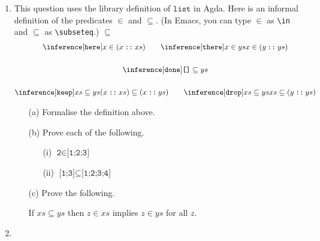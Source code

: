 \documentclass{examhons2018}
\begin{document}
\begin{enumerate}
 
\item \rubricqA

\newcommand{\key}{\texttt}
\newcommand{\List}{\key{list}}
\newcommand{\nil}{\texttt{[]}}
\newcommand{\cons}{\mathbin{\key{::}}}
\newcommand{\member}{\key{member}}
\newcommand{\sublist}{\key{sublist}}

This question uses the library definition of $\List$ in Agda.
Here is an informal definition of the predicates $\in$
and $\subseteq$.  (In Emacs, you can type $\in$ as \verb$\in$ and $\subseteq$ as \verb$\subseteq$.)
$\subseteq$
\begin{gather*}
\inference[$\key{here}$]
  {}
  {x \in (x \cons xs)}
\qquad
\inference[$\key{there}$]
  {x \in ys}
  {x \in (y \cons ys)}
\\~\\
\inference[$\key{done}$]
  {}
  {\nil \subseteq ys}
\\~\\
\inference[$\key{keep}$]
  {xs \subseteq ys}
  {(x \cons xs) \subseteq (x \cons ys)}
\qquad
\inference[$\key{drop}$]
  {xs \subseteq ys}
  {xs \subseteq (y \cons ys)}
\end{gather*}

\begin{itemize}

\item[(a)] Formalise the definition above.

\item[(b)] Prove each of the following.
  \begin{itemize}
  \item[(i)]  $\key{2} \in \key{[1;2;3]}$
  \item[(ii)]  $\key{[1;3]} \subseteq \key{[1;2;3;4]}$
  \end{itemize}

\item[(c)] Prove the following.
\begin{center}
If $xs \subseteq ys$ then $z \in xs$ implies $z \in ys$ for all $z$.
\end{center}    

\end{itemize}

\newpage

\item \rubricqB

\newcommand{\Tree}{\texttt{Tree}}
\newcommand{\leaf}{\texttt{leaf}}
\newcommand{\branch}{\texttt{branch}}
\newcommand{\CASET}{\texttt{caseT}}
\newcommand{\caseT}[6]{\texttt{case}~#1~\texttt{[leaf}~#2~\Rightarrow~#3~\texttt{|}~#4~\texttt{branch}~#5~\Rightarrow~#6\texttt{]}}
\newcommand{\ubar}{\texttt{\underline{~}}}
\newcommand{\comma}{\,\texttt{,}\,}
\newcommand{\V}{\texttt{V}}
\newcommand{\dash}{\texttt{-}}
\newcommand{\Value}{\texttt{Value}}
\newcommand{\becomes}{\longrightarrow}
\newcommand{\subst}[3]{#1~\texttt{[}~#2~\texttt{:=}~#3~\texttt{]}}



\end{enumerate}
\end{document}
